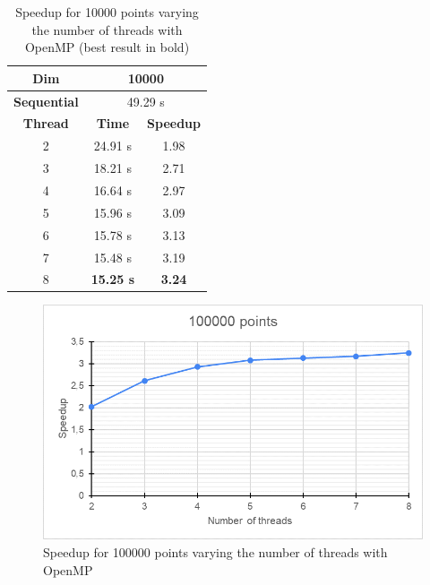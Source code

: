 \documentclass[10pt,twocolumn,letterpaper]{article}
\begin{document}
\begin{table}[]
\centering
\begin{tabular}{|c|c|c|}
\hline
\textbf{Dim} & \multicolumn{2}{c|}{10000} \\ \hline
\textbf{Sequential} & \multicolumn{2}{c|}{49.29 s} \\ \hline
\textbf{Thread} & \textbf{Time} & \textbf{Speedup} \\ \hline
2 & 24.91 s & 1.98 \\ \hline
3 & 18.21 s & 2.71 \\ \hline
4 & 16.64 s & 2.97 \\ \hline
5 & 15.96 s & 3.09 \\ \hline
6 & 15.78 s & 3.13 \\ \hline
7 & 15.48 s & 3.19 \\ \hline
8 & \textbf{15.25 s} & \textbf{3.24} \\ \hline
\end{tabular}
\caption{Speedup for 10000 points varying the number of threads with OpenMP (best result in bold)}
\label{tab:table10000points}
\end{table}

\begin{figure}
\includegraphics[width=0.99\linewidth]{img/chart_100000_points}
\caption{Speedup for 100000 points varying the number of threads with OpenMP}
\label{fig:chart100000points}
\end{figure}
\end{document}
